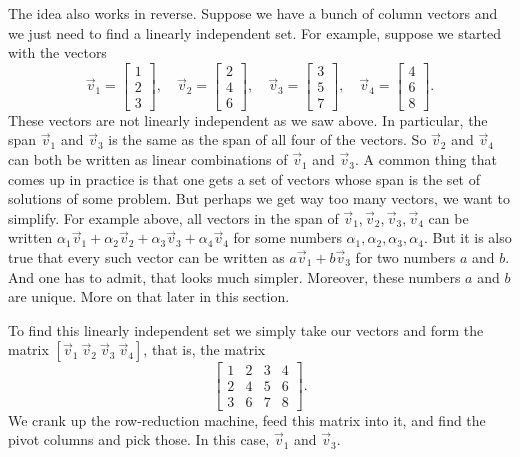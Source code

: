 The idea also works in reverse.  Suppose we have a bunch of column vectors
and we just need to find a linearly independent set.  For example, suppose
we started with the vectors
\begin{equation*}
\vec{v}_1 =
\begin{bmatrix}
1 \\
2 \\
3 
\end{bmatrix}
,
\quad
\vec{v}_2 =
\begin{bmatrix}
2 \\
4 \\
6
\end{bmatrix}
,
\quad
\vec{v}_3 =
\begin{bmatrix}
3 \\
5 \\
7
\end{bmatrix}
,
\quad
\vec{v}_4 =
\begin{bmatrix}
4 \\
6 \\
8
\end{bmatrix} .
\end{equation*}
These vectors are not linearly independent as we saw above.  In particular,
the span $\vec{v}_1$ and $\vec{v}_3$ is the same as
the span of all four of the vectors.  So $\vec{v}_2$ and $\vec{v}_4$
can both be written as linear combinations of $\vec{v}_1$ and $\vec{v}_3$.
A common thing that comes up in practice is that one gets a set of vectors
whose span is the set of solutions of some problem.  But perhaps we get way
too many vectors, we want to simplify.  For example above, all vectors in
the span of
$\vec{v}_1, \vec{v}_2, \vec{v}_3, \vec{v}_4$ can be written
$\alpha_1 \vec{v}_1 + \alpha_2 \vec{v}_2 + \alpha_3 \vec{v}_3 + \alpha_4
\vec{v}_4$ for some numbers $\alpha_1,\alpha_2,\alpha_3,\alpha_4$.  But
it is also true that every such vector can be written as
$a \vec{v}_1 + b \vec{v}_3$ for two numbers $a$ and $b$.  And one has to
admit, that looks much simpler.  Moreover, these numbers $a$ and $b$ are
unique.  More on that later in this section.

To find this linearly independent set we simply take our vectors
and form the matrix $[ \vec{v}_1 ~ \vec{v}_2 ~ \vec{v}_3 ~ \vec{v}_4 ]$,
that is, the matrix
\begin{equation*}
\begin{bmatrix}
1 & 2 & 3 & 4 \\
2 & 4 & 5 & 6 \\
3 & 6 & 7 & 8
\end{bmatrix} .
\end{equation*}
We crank up the row-reduction machine, feed this matrix into it, and find
the pivot columns and pick those.  In this case, $\vec{v}_1$ and
$\vec{v}_3$.


